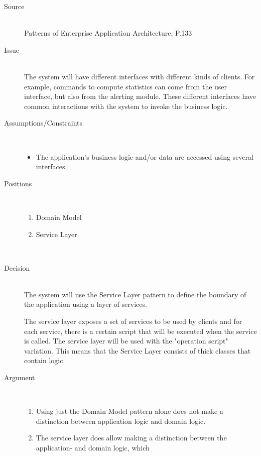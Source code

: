 \begin{description}
\item [Source]~\\
Patterns of Enterprise Application Architecture, P.133 \cite{Fowler:2002:PEA:579257}

\item [Issue]~\\
The system will have different interfaces with different kinds of clients. For example, commands to compute statistics can come from the user interface, but also from the alerting module. These different interfaces have common interactions with the system to invoke the business logic. %

\item [Assumptions/Constraints]~
\begin{itemize}
\item The application's business logic and/or data are accessed using several interfaces.
\end{itemize}

\item [Positions]~
\begin{enumerate}
\item Domain Model %
\item Service Layer
\end{enumerate}
~\\[-1.5cm]

\item [Decision] ~\\
The system will use the Service Layer pattern to define the boundary of the application using a layer of services.

The service layer exposes a set of services to be used by clients and for each service, there is a certain script that will be executed when the service is called. The service layer will be used with the "operation script" variation. This means that the Service Layer consists of thick classes that contain logic. %

\item [Argument]~
\begin{enumerate}
\item Using just the Domain Model pattern alone does not make a distinction between application logic and domain logic.

\item The service layer does allow making a distinction between the application- and domain logic, which 
\end{enumerate}


\end{description}

